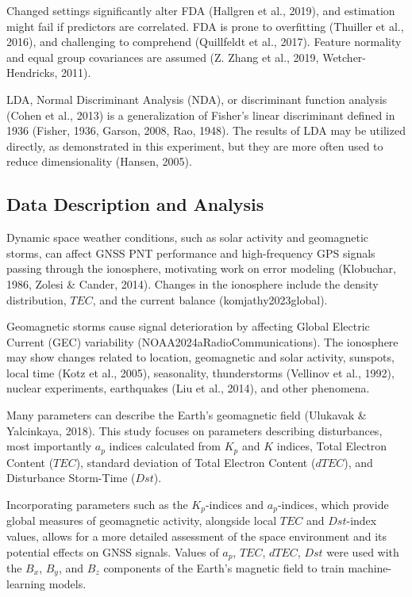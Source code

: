 \documentclass[sn-mathphys-num]{sn-jnl}%
\begin{document}
Changed settings significantly alter FDA (Hallgren et al., 2019), and estimation might fail if predictors are correlated. FDA is prone to overfitting (Thuiller et al., 2016), and challenging to comprehend (Quillfeldt et al., 2017). Feature normality and equal group covariances are assumed (Z. Zhang et al., 2019, Wetcher-Hendricks, 2011).

LDA, Normal Discriminant Analysis (NDA), or discriminant function analysis (Cohen et al., 2013) is a generalization of Fisher's linear discriminant defined in 1936 (Fisher, 1936, Garson, 2008, Rao, 1948). The results of LDA may be utilized directly, as demonstrated in this experiment, but they are more often used to reduce dimensionality (Hansen, 2005).

\subsection{Data Description and Analysis}

Dynamic space weather conditions, such as solar activity and geomagnetic storms, can affect  GNSS PNT performance and high-frequency GPS signals passing through the ionosphere, motivating work on error modeling (Klobuchar, 1986, Zolesi & Cander, 2014). Changes in the ionosphere include the density distribution, $TEC$, and the current balance (komjathy2023global).

Geomagnetic storms cause signal deterioration by affecting Global Electric Current (GEC) variability (NOAA2024aRadioCommunications). The ionosphere may show changes related to location, geomagnetic and solar activity, sunspots, local time (Kotz et al., 2005), seasonality, thunderstorms (Vellinov et al., 1992), nuclear experiments, earthquakes (Liu et al., 2014), and other phenomena.

Many parameters can describe the Earth's geomagnetic field (Ulukavak & Yalcinkaya, 2018). This study focuses on parameters describing disturbances, most importantly $a_{p}$ indices calculated from $K_{p}$ and $K$ indices, Total Electron Content ($TEC$), standard deviation of Total Electron Content ($dTEC$), and Disturbance Storm-Time ($Dst$). 

Incorporating parameters such as the $K_{p}$-indices and $a_{p}$-indices, which provide global measures of geomagnetic activity, alongside local $TEC$ and $Dst$-index values, allows for a more detailed assessment of the space environment and its potential effects on GNSS signals. Values of $a_{p}$, $TEC$, $dTEC$, $Dst$ were used with the $B_x$, $B_y$, and $B_z$ components of the Earth's magnetic field to train machine-learning models.
\end{document}
